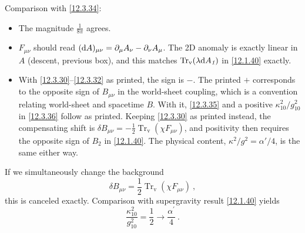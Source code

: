 \begin{tcolorbox}[breakable]
\begin{remark}
		Comparison with \eqref{12.3.34}:
		\begin{itemize}
			\item The magnitude $\frac{1}{8\pi}$ agrees.
			\item $F_{\mu\nu}$ should read $(\mathrm{d} A)_{\mu\nu}=\partial_{\mu}A_{\nu}-\partial_{\nu}A_{\mu}$. The 2D anomaly is exactly linear in $A$ (descent, previous box), and this matches $\operatorname{Tr}_{\mathrm v}(\lambda\mathrm{d} A_{\textit{1}})$ in \eqref{12.1.40} exactly.
			\item With \eqref{12.3.30}--\eqref{12.3.32} as printed, the sign is $-$. The printed $+$ corresponds to the opposite sign of $B_{\mu\nu}$ in the world-sheet coupling, which is a convention relating world-sheet and spacetime $B$. With it, \eqref{12.3.35} and a positive $\kappa^{2}_{10}/g^{2}_{10}$ in \eqref{12.3.36} follow as printed. Keeping \eqref{12.3.30} as printed instead, the compensating shift is $\delta B_{\mu\nu}=-\frac12\operatorname{Tr}_{\mathrm v}(\chi F_{\mu\nu})$, and positivity then requires the opposite sign of $B_{\textit{2}}$ in \eqref{12.1.40}. The physical content, $\kappa^{2}/g^{2}=\alpha'/4$, is the same either way.
		\end{itemize}
	\end{remark}
\end{tcolorbox}
If we simultaneously change the background
\begin{equation}
	\delta B_{\mu\nu} = \frac{1}{2}\operatorname{Tr}_{\mathrm{v}}(\chi F_{\mu\nu}) \:, \label{12.3.35}
\end{equation}
this is canceled exactly. Comparison with supergravity result \eqref{12.1.40} yields
\begin{equation}
	\frac{\kappa_{10}^{2}}{g_{10}^{2}} = \frac{1}{2} \to \frac{\alpha^{\prime}}{4} \:. \label{12.3.36}
\end{equation}
